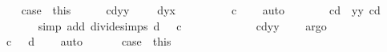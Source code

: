 \begin{isabellebody}
\ \ \isamarkupfalse%
\ case{}\ {\isacharequal}\ this\isanewline
\ \ \isacommand{{\isacharbraceleft}}\isamarkupfalse%
\isamarkupfalse%
\ {\isachardoublequoteopen}{\isacharparenleft}{}\ {\isacharminus}\ c{\isacharasterisk}d{\isacharasterisk}y{}{\isacharcircum}{}{\isacharasterisk}y{}{\isacharcircum}{}{\isacharparenright}\ {\isacharequal}\ {}{\isachardoublequoteclose}\ {\isachardoublequoteopen}{\isacharparenleft}{}\ {\isacharminus}\ d{\isacharasterisk}y{}{\isacharcircum}{}{\isacharasterisk}x{}{\isacharcircum}{}{\isacharparenright}\ {\isasymnoteq}\ {}{\isachardoublequoteclose}\isanewline
\ \ \ \ \isamarkupfalse%
\ \isamarkupfalse%
\ {\isachardoublequoteopen}c\ {\isasymnoteq}\ {}{\isachardoublequoteclose}\ \isamarkupfalse%
\ auto\isanewline
\ \ \ \ \isamarkupfalse%
\ \isamarkupfalse%
\ {\isachardoublequoteopen}{}{\isacharslash}{\isacharparenleft}c{\isacharasterisk}d{\isacharparenright}\ {\isacharequal}\ y{}{\isacharcircum}{}{\isacharasterisk}y{}{\isacharcircum}{}{\isachardoublequoteclose}\ {\isachardoublequoteopen}{}{\isacharslash}{\isacharparenleft}c{\isacharasterisk}d{\isacharparenright}\ {\isasymnoteq}\ {}{\isachardoublequoteclose}\ \isanewline
\ \ \ \ \ \ \isamarkupfalse%
{\isacharparenleft}simp\ add{\isacharcolon}\ divide{\isacharunderscore}simps\ {\isacartoucheopen}d\ {\isasymnoteq}\ {}{\isacartoucheclose}\ {\isacartoucheopen}c\ {\isasymnoteq}\ {}{\isacartoucheclose}{\isacharparenright}\ \isanewline
\ \ \ \ \ \ \isamarkupfalse%
\ {\isacartoucheopen}{\isacharparenleft}{}\ {\isacharminus}\ c{\isacharasterisk}d{\isacharasterisk}y{}{\isacharcircum}{}{\isacharasterisk}y{}{\isacharcircum}{}{\isacharparenright}\ {\isacharequal}\ {}{\isacartoucheclose}\ \isamarkupfalse%
\ argo\isanewline
\ \ \ \ \ \ \isamarkupfalse%
\ {\isacartoucheopen}c\ {\isasymnoteq}\ {}{\isacartoucheclose}\ {\isacartoucheopen}d\ {\isasymnoteq}\ {}{\isacartoucheclose}\ \isamarkupfalse%
\ auto\isanewline
\ \ \isacommand{{\isacharbraceright}}\isamarkupfalse%
\isanewline
\ \ \isamarkupfalse%
\ case{}\ {\isacharequal}\ this\isanewline

\end{isabellebody}
